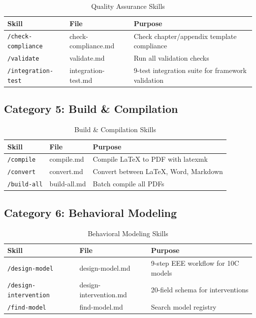 \begin{table}[htbp]
\centering
\begin{tabular}{|l|l|p{6cm}|}
\hline
\textbf{Skill} & \textbf{File} & \textbf{Purpose} \\
\hline
\texttt{/check-compliance} & check-compliance.md & Check chapter/appendix template compliance \\
\texttt{/validate} & validate.md & Run all validation checks \\
\texttt{/integration-test} & integration-test.md & 9-test integration suite for framework validation \\
\hline
\end{tabular}
\caption{Quality Assurance Skills}
\end{table}


\subsection{Category 5: Build \& Compilation}

\begin{table}[htbp]
\centering
\begin{tabular}{|l|l|p{6cm}|}
\hline
\textbf{Skill} & \textbf{File} & \textbf{Purpose} \\
\hline
\texttt{/compile} & compile.md & Compile LaTeX to PDF with latexmk \\
\texttt{/convert} & convert.md & Convert between LaTeX, Word, Markdown \\
\texttt{/build-all} & build-all.md & Batch compile all PDFs \\
\hline
\end{tabular}
\caption{Build \& Compilation Skills}
\end{table}


\subsection{Category 6: Behavioral Modeling}

\begin{table}[htbp]
\centering
\begin{tabular}{|l|l|p{6cm}|}
\hline
\textbf{Skill} & \textbf{File} & \textbf{Purpose} \\
\hline
\texttt{/design-model} & design-model.md & 9-step EEE workflow for 10C models \\
\texttt{/design-intervention} & design-intervention.md & 20-field schema for interventions \\
\texttt{/find-model} & find-model.md & Search model registry \\
\hline
\end{tabular}
\caption{Behavioral Modeling Skills}
\end{table}


